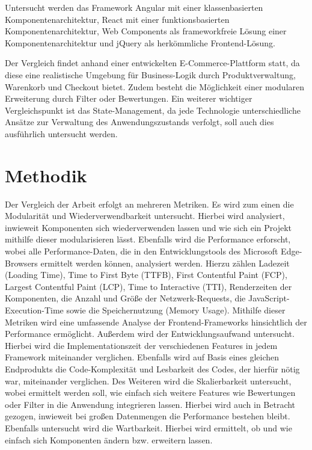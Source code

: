 \documentclass[oneside]{ausarbeitung}
\begin{document}
Untersucht werden das Framework Angular mit einer klassenbasierten Komponentenarchitektur, React mit einer funktionsbasierten Komponentenarchitektur, Web Components als frameworkfreie Lösung einer Komponentenarchitektur und jQuery als herkömmliche Frontend-Lösung.

Der Vergleich findet anhand einer entwickelten E-Commerce-Plattform statt, da diese eine realistische Umgebung für Business-Logik durch Produktverwaltung, Warenkorb und Checkout bietet. Zudem besteht die Möglichkeit einer modularen Erweiterung durch Filter oder Bewertungen. Ein weiterer wichtiger Vergleichspunkt ist das State-Management, da jede Technologie unterschiedliche Ansätze zur Verwaltung des Anwendungszustands verfolgt, soll auch dies ausführlich untersucht werden.

\section{Methodik}
Der Vergleich der Arbeit erfolgt an mehreren Metriken. Es wird zum einen die Modularität und Wiederverwendbarkeit untersucht. Hierbei wird analysiert, inwieweit Komponenten sich wiederverwenden lassen und wie sich ein Projekt mithilfe dieser modularisieren lässt. Ebenfalls  wird die Performance erforscht, wobei alle Performance-Daten, die in den Entwicklungstools des Microsoft Edge-Browsers ermittelt werden können, analysiert werden. Hierzu zählen Ladezeit (Loading Time), Time to First Byte (TTFB), First Contentful Paint (FCP), Largest Contentful Paint (LCP), Time to Interactive (TTI), Renderzeiten der Komponenten, die Anzahl und Größe der Netzwerk-Requests, die JavaScript-Execution-Time sowie die Speichernutzung (Memory Usage). Mithilfe dieser Metriken wird eine umfassende Analyse der Frontend-Frameworks hinsichtlich der Performance ermöglicht. Außerdem wird der Entwicklungsaufwand untersucht. Hierbei wird die Implementationszeit der verschiedenen Features in jedem Framework miteinander verglichen. Ebenfalls wird auf Basis eines gleichen Endprodukts die Code-Komplexität und Lesbarkeit des Codes, der hierfür nötig war, miteinander verglichen. Des Weiteren wird die Skalierbarkeit untersucht, wobei ermittelt werden soll, wie einfach sich weitere Features wie Bewertungen oder Filter in die Anwendung integrieren lassen. Hierbei wird auch in Betracht gezogen, inwieweit bei großen Datenmengen die Performance bestehen bleibt. Ebenfalls untersucht wird die Wartbarkeit. Hierbei wird ermittelt, ob und wie einfach sich Komponenten ändern bzw. erweitern lassen.  
\end{document}
